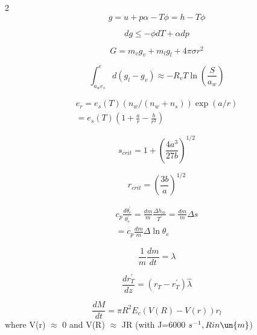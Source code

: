 \documentclass[12pt]{article}
\begin{document}
\begin{multicols}{2}
  \begin{equation}
  g = u + p\alpha - T\phi = h - T\phi
\label{eq:gdef}
  \end{equation}

  \begin{equation}
    \label{eq:dg}
    dg \leq -\phi dT + \alpha dp
  \end{equation}


  \begin{equation}
    \label{eq:G}
    G = m_v g_v + m_l g_l + 4 \pi \sigma r^2
  \end{equation}

  \begin{equation}
    \label{eq:newint}
    \int_{a_w e_s}^e  d(g_l - g_v) \approx  - R_v T\ln \left (
      \frac{S}{a_w} \right )
  \end{equation}



\begin{multline}
  \label{equil}
  e_{r} = e_s(T)(n_w/(n_w + n_s))\exp(a/r) \\
  = e_s(T)(1 + \frac{a}{r} - \frac{b}{r^3})
\end{multline}

\begin{equation}
  \label{eq:sscrit}
  s_{crit}= 1 + \left ( \frac{4 a^3}{27 b} \right )^{1/2}
\end{equation}

\begin{equation}
  \label{eq:rcrit}
  r_{crit} = \left ( \frac{3b}{a} \right )^{1/2}
\end{equation}

\begin{gather}
  \label{eq:2ndb}
  c_p \frac{d\theta_e^\prime}{\theta_e^\prime} = 
          \frac{dm}{m} \frac{\Delta h_m}{T^\prime} = \frac{dm}{m} \Delta s \nonumber\\
   = c_p \frac{dm}{m} \Delta \ln \theta_e    
\end{gather}

\begin{equation}
  \label{eq:plume}
  \frac{1}{m} \frac{dm}{dt} = \lambda
\end{equation}

\begin{equation}
  \label{eq:water}
  \frac{dr_T^\prime}{dz} = (r_T - r_T^\prime) \hat{\lambda}
\end{equation}

\begin{equation}
  \label{eq:collec}
  \frac{dM}{dt} = \pi R^2 E_c (V(R) - V(r)) r_l
\end{equation}
where V(r) $\approx$ 0 and V(R) $\approx$ JR (with J=6000 $s^{-1}, R in \un{m}$)


\end{multicols}
\end{document}

